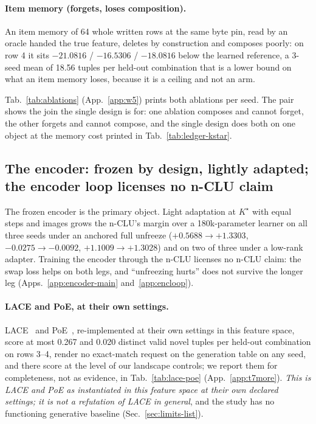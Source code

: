 \documentclass{article} %
\newcommand{\Kstar}{\ensuremath{K^{\star}}}
\begin{document}
\paragraph{Item memory (forgets, loses composition).} An item memory of 64 whole written rows at
the same byte pin, read by an oracle handed the true feature, deletes by construction and
composes poorly: on row 4 it sits $-21.0816$ / $-16.5306$ / $-18.0816$ below the learned
reference, a 3-seed mean of 18.56 tuples per held-out combination that is a lower bound on what an item memory
loses, because it is a ceiling and not an arm. %

Tab.~\ref{tab:ablations} (App.~\ref{app:w5}) prints both ablations per seed. The pair shows
the join the single design is for: one ablation composes and cannot
forget, the other forgets and cannot compose, and the single design does both on one object at
the memory cost printed in Tab.~\ref{tab:ledger-kstar}.

\subsection{The encoder: frozen by design, lightly adapted; the encoder loop licenses no n-CLU claim}
\label{sec:adapt}\label{sec:bard}
The frozen encoder is the primary object. Light adaptation at $\Kstar$ with equal steps and
images grows the n-CLU's margin over a 180k-parameter learner on all three seeds under an
anchored full unfreeze ($+0.5688\to+1.3303$, $-0.0275\to-0.0092$, $+1.1009\to+1.3028$) and on two
of three under a low-rank adapter. %
Training the encoder through the n-CLU licenses no n-CLU claim: the swap loss helps on both legs,
and ``unfreezing hurts'' does not survive the longer leg (Apps.~\ref{app:encoder-main}
and~\ref{app:encloop}).

\paragraph{LACE and PoE, at their own settings.}
LACE~\citep{nie2021controllable} and PoE~\citep{hinton2002training}, re-implemented at their own
settings in this feature space, score at most 0.267 and 0.020 distinct valid novel tuples per held-out combination %
on rows 3--4, render no exact-match request on the generation table on any seed, and there score at
the level of our landscape controls; we report them for completeness, not as evidence, in
Tab.~\ref{tab:lace-poe} (App.~\ref{app:t7more}). \emph{This is LACE and PoE as instantiated in
this feature space at their own declared settings; it is not a refutation of LACE in general}, and
the study has no functioning generative baseline (Sec.~\ref{sec:limits-list}).
\end{document}
